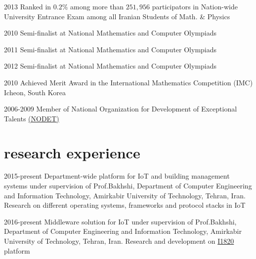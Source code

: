 \documentclass[]{friggeri-cv} %
\begin{document}
\begin{entrylist}

	\entry
	{2013}
	{\normalfont Ranked in $0.2\%$ among more than $251,956$ participators in Nation-wide University Entrance Exam among all Iranian Students of Math. \& Physics}
	{}
	{}


	\entry
	{2010}
	{\textcolor{TextOrange}{Semi-finalist} {\normalfont at National Mathematics and Computer Olympiads}}
	{}
	{}


	\entry
	{2011}
	{\textcolor{TextOrange}{Semi-finalist} {\normalfont at National Mathematics and Computer Olympiads}}
	{}
	{}


	\entry
	{2012}
	{\textcolor{TextOrange}{Semi-finalist} {\normalfont at National Mathematics and Computer Olympiads}}
	{}
	{}


	\entry
	{2010}
	{{\normalfont Achieved} \textcolor{Ocean}{Merit Award} {\normalfont in the International Mathematics Competition (IMC) Icheon, South Korea}}
	{}
	{}


	\entry
	{2006-2009}
	{\normalfont Member of National Organization for Development of Exceptional Talents \href{https://en.wikipedia.org/wiki/National_Organization_for_Development_of_Exceptional_Talents}{(NODET)}}
	{}
	{}


\end{entrylist}


\section{research experience}

\begin{entrylist}

	\entry
	{2015-present}
	{Department-wide platform for IoT and building management systems}
	{under supervision of Prof.Bakhshi, Department of Computer Engineering and Information Technology, Amirkabir University of Technology, Tehran, Iran.}
	{Research on different operating systems, frameworks and protocol stacks in IoT}
	
	\entry
	{2016-present}
	{Middleware solution for IoT}
	{under supervision of Prof.Bakhshi, Department of Computer Engineering and Information Technology, Amirkabir University of Technology, Tehran, Iran.}
	{Research and development on \href{https://github.com/aolab/I1820}{I1820} platform}


\end{entrylist}
\end{document}
